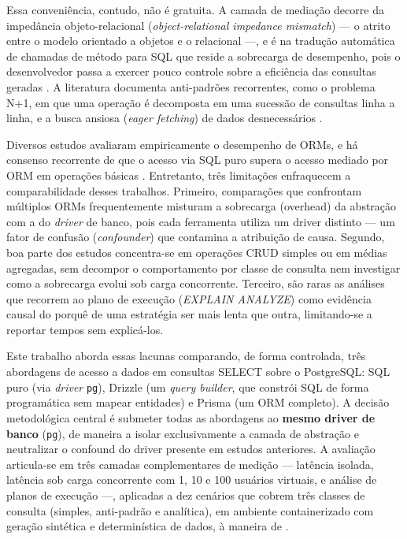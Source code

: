 \documentclass[12pt]{article}
\begin{document}
Essa conveniência, contudo, não é gratuita. A camada de mediação decorre
da impedância objeto-relacional (\textit{object-relational impedance
mismatch}) --- o atrito entre o modelo orientado a objetos e o relacional
---, e é na tradução automática de chamadas de método para SQL que reside
a sobrecarga de desempenho, pois o desenvolvedor passa a exercer pouco
controle sobre a eficiência das consultas geradas \cite{nicoletti2024}. A
literatura documenta anti-padrões recorrentes, como o problema N+1, em
que uma operação é decomposta em uma sucessão de consultas linha a linha,
e a busca ansiosa (\textit{eager fetching}) de dados desnecessários
\cite{colley2020}.

Diversos estudos avaliaram empiricamente o desempenho de ORMs, e há
consenso recorrente de que o acesso via SQL puro supera o acesso mediado
por ORM em operações básicas \cite{yusmita2025,colley2020}. Entretanto,
três limitações enfraquecem a comparabilidade desses trabalhos. Primeiro,
comparações que confrontam múltiplos ORMs frequentemente misturam a
sobrecarga (overhead) da abstração com a do \textit{driver} de banco,
pois cada ferramenta utiliza um driver distinto --- um fator de confusão
(\textit{confounder}) que contamina a atribuição de causa. Segundo, boa
parte dos estudos concentra-se em operações CRUD simples ou em médias
agregadas, sem decompor o comportamento por classe de consulta nem
investigar como a sobrecarga evolui sob carga concorrente. Terceiro, são
raras as análises que recorrem ao plano de execução (\textit{EXPLAIN
ANALYZE}) como evidência causal do porquê de uma estratégia ser mais
lenta que outra, limitando-se a reportar tempos sem explicá-los.

Este trabalho aborda essas lacunas comparando, de forma controlada, três
abordagens de acesso a dados em consultas SELECT sobre o PostgreSQL: SQL
puro (via \textit{driver} \texttt{pg}), Drizzle (um \textit{query
builder}, que constrói SQL de forma programática sem mapear entidades) e
Prisma (um ORM completo). A decisão metodológica central é submeter todas
as abordagens
ao \textbf{mesmo driver de banco} (\texttt{pg}), de maneira a isolar
exclusivamente a camada de abstração e neutralizar o confound do driver
presente em estudos anteriores. A avaliação articula-se em três camadas
complementares de medição --- latência isolada, latência sob carga
concorrente com 1, 10 e 100 usuários virtuais, e análise de planos de
execução ---, aplicadas a dez cenários que cobrem três classes de
consulta (simples, anti-padrão e analítica), em ambiente containerizado
com geração sintética e determinística de dados, à maneira de
\cite{yusmita2025}.
\end{document}
